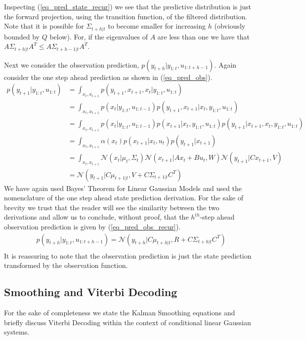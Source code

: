 Inspecting (\ref{eq_pred_state_recur}) we see that the predictive distribution is just the forward projection, using the transition function, of the filtered distribution. Note that it is possible for $\Sigma_{t+h|t}$ to become smaller for increasing $h$ (obviously bounded by $Q$ below). For, if the eigenvalues of $A$ are less than one we have that $A\Sigma_{t+h|t}A^T \leq A\Sigma_{t+h-1|t}A^T$.

Next we consider the observation prediction, $p(y_{t+h}|y_{1:t}, u_{1:t+h-1})$. Again consider the one step ahead prediction as shown in (\ref{eq_pred_obs}).
\begin{equation}
\begin{aligned}
p(y_{t+1}|y_{1:t}, u_{1:t}) &= \int_{x_t, x_{t+1}} p(y_{t+1},x_{t+1},x_t|y_{1:t}, u_{1:t}) \\
&= \int_{x_t, x_{t+1}} p(x_t|y_{1:t}, u_{1:t-1})p(y_{t+1},x_{t+1}|x_t, y_{1:t}, u_{1:t}) \\
&= \int_{x_t, x_{t+1}} p(x_t|y_{1:t}, u_{1:t-1}) p(x_{t+1}|x_t, y_{1:t}, u_{1:t})p(y_{t+1}|x_{t+1}, x_t, y_{1:t}, u_{1:t}) \\
&= \int_{x_t, x_{t+1}} \alpha(x_t) p(x_{t+1}|x_t, u_{t}) p(y_{t+1}|x_{t+1}) \\
&= \int_{x_t, x_{t+1}} \mathcal{N}(x_t|\mu_t,\Sigma_t) \mathcal{N}(x_{t+1}|Ax_t+Bu_t, W) \mathcal{N}(y_{t+1}|Cx_{t+1}, V) \\
&= \mathcal{N}(y_{t+1}|C\mu_{t+1|t}, V+C\Sigma_{t+1|t}C^T)
\end{aligned}
\label{eq_pred_obs}
\end{equation}
We have again used Bayes' Theorem for Linear Gaussian Models and used the nomenclature of the one step ahead state prediction derivation. For the sake of brevity we trust that the reader will see the similarity between the two derivations and allow us to conclude, without proof, that the $h^{th}$-step ahead observation prediction is given by (\ref{eq_pred_obs_recur}).
\begin{equation}
\begin{aligned}
&p(y_{t+h}|y_{1:t}, u_{1:t+h-1}) = \mathcal{N}(y_{t+h}|C\mu_{t+h|t}, R+C\Sigma_{t+h|t}C^T) \\
\end{aligned}
\label{eq_pred_obs_recur}
\end{equation}
It is reassuring to note that the observation prediction is just the state prediction transformed by the observation function.

\subsection{Smoothing and Viterbi Decoding}
For the sake of completeness we state the Kalman Smoothing equations and briefly discuss Viterbi Decoding within the context of conditional linear Gaussian systems. 

